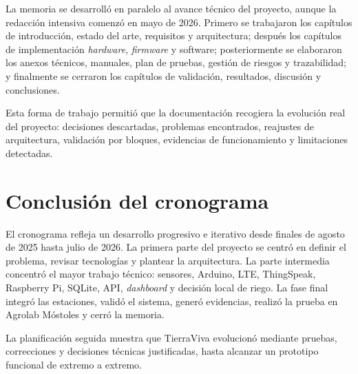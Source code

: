 La memoria se desarrolló en paralelo al avance técnico del proyecto, aunque la redacción intensiva comenzó en mayo de 2026. Primero se trabajaron los capítulos de introducción, estado del arte, requisitos y arquitectura; después los capítulos de implementación \textit{hardware}, \textit{firmware} y software; posteriormente se elaboraron los anexos técnicos, manuales, plan de pruebas, gestión de riesgos y trazabilidad; y finalmente se cerraron los capítulos de validación, resultados, discusión y conclusiones.

Esta forma de trabajo permitió que la documentación recogiera la evolución real del proyecto: decisiones descartadas, problemas encontrados, reajustes de arquitectura, validación por bloques, evidencias de funcionamiento y limitaciones detectadas.

\section{Conclusión del cronograma}

El cronograma refleja un desarrollo progresivo e iterativo desde finales de agosto de 2025 hasta julio de 2026. La primera parte del proyecto se centró en definir el problema, revisar tecnologías y plantear la arquitectura. La parte intermedia concentró el mayor trabajo técnico: sensores, Arduino, LTE, ThingSpeak, Raspberry Pi, SQLite, API, \textit{dashboard} y decisión local de riego. La fase final integró las estaciones, validó el sistema, generó evidencias, realizó la prueba en Agrolab Móstoles y cerró la memoria.

La planificación seguida muestra que TierraViva evolucionó mediante pruebas, correcciones y decisiones técnicas justificadas, hasta alcanzar un prototipo funcional de extremo a extremo.